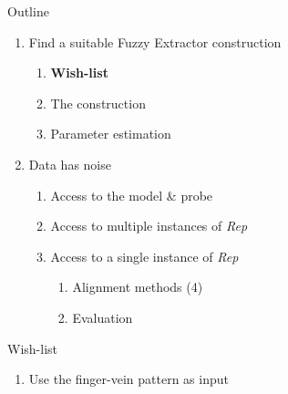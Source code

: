 \documentclass{beamer}
\def\fe{Fuzzy Extractor\xspace}
\newcommand{\rep}{\textit{Rep}\xspace}
\begin{document}
\begin{frame}{Outline}
   \begin{enumerate}
   \item Find a suitable \fe construction
\begin{enumerate}
    \item \textbf{Wish-list}
    \item The construction
    \item Parameter estimation\\
\end{enumerate}
   \item Data has noise
   \begin{enumerate}
       \item Access to the model \& probe
       \item Access to multiple instances of \rep
       \item Access to a single instance of \rep
        \begin{enumerate}
            \item Alignment methods (4)
            \item Evaluation
        \end{enumerate}
   \end{enumerate}    
\end{enumerate} 
\end{frame}
\begin{frame}{Wish-list}
    \begin{enumerate}
        \item Use the finger-vein pattern as input
    \end{enumerate}
\end{frame}
\end{document}
